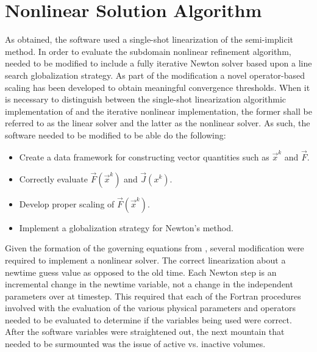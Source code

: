 \section{Nonlinear Solution Algorithm}
\label{sect:nln_cobra_alg}
As obtained, the \cobra{} software used a single-shot linearization of the semi-implicit method.
In order to evaluate the subdomain nonlinear refinement algorithm, \cobra{} needed to be modified to include a fully iterative Newton solver based upon a line search globalization strategy.
As part of the \cobra{} modification a novel operator-based scaling has been developed to obtain meaningful convergence thresholds.
When it is necessary to distinguish between the single-shot linearization algorithmic implementation of \cobra{} and the iterative nonlinear \cobra{} implementation, the former shall be referred to as the linear solver and the latter as the nonlinear solver.
As such, the \cobra{} software needed to be modified to be able do the following:

\begin{itemize}
\item{Create a data framework for constructing vector quantities such as $\vec{x}^{k}$ and $\vec{F}$.}
\item{Correctly evaluate $\vec{F}(\vec{x}^{k})$ and $\vec{J}(x^{k})$.}
\item{Develop proper scaling of $\vec{F}(\vec{x}^{k})$.}
\item{Implement a globalization strategy for Newton's method.}
\end{itemize}

Given the formation of the governing equations from , several modification were required to implement a nonlinear solver.
The correct linearization about a newtime guess value as opposed to the old time.
Each Newton step is an incremental change in the newtime variable, not a change in the independent parameters over at timestep.
This required that each of the Fortran procedures involved with the evaluation of the various physical parameters and operators needed to be evaluated to determine if the variables being used were correct.
After the software variables were straightened out, the next mountain that needed to be surmounted was the issue of active vs. inactive volumes.


